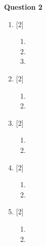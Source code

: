 \par
\noindent
\textbf{Question 2}\\
\begin{enumerate}[label=(\roman*)]

    \item \hfill [2]
        \begin{enumerate}[label=(\alph*)]
            \item 
            \item 
            \item 
        \end{enumerate}

    \item \hfill [2]
        \begin{enumerate}[label=(\alph*)]
            \item 
            \item 
        \end{enumerate}


    \item \hfill [2]
        \begin{enumerate}[label=(\alph*)]
            \item 
            \item 
        \end{enumerate}

    \item \hfill [2]
        \begin{enumerate}[label=(\alph*)]
            \item 
            \item 
        \end{enumerate}

    \item \hfill [2]
        \begin{enumerate}[label=(\alph*)]
            \item 
            \item 
        \end{enumerate}

\end{enumerate}

